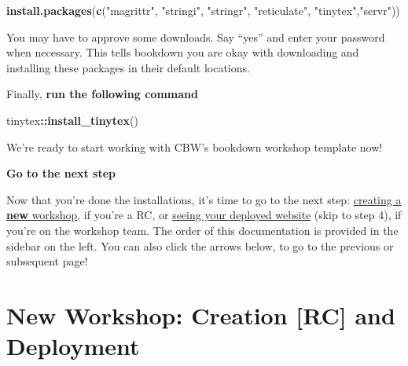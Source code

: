 \documentclass[
]{book}
\newenvironment{Shaded}{\begin{snugshade}}{\end{snugshade}}
\newcommand{\FunctionTok}[1]{\textcolor[rgb]{0.13,0.29,0.53}{\textbf{#1}}}
\newcommand{\NormalTok}[1]{#1}
\newcommand{\SpecialCharTok}[1]{\textcolor[rgb]{0.81,0.36,0.00}{\textbf{#1}}}
\newcommand{\StringTok}[1]{\textcolor[rgb]{0.31,0.60,0.02}{#1}}
\newenvironment{bluebox}{
  \definecolor{shadecolor}{RGB}{172, 210, 237}
  \color{white}
  \begin{shaded}}
 {\end{shaded}}
\theoremstyle{definition}
\theoremstyle{definition}
\theoremstyle{definition}
\theoremstyle{definition}
\theoremstyle{remark}
\begin{document}
\begin{enumerate}
\begin{itemize}
\begin{Shaded}
\begin{Highlighting}[]
\FunctionTok{install.packages}\NormalTok{(}\FunctionTok{c}\NormalTok{(}\StringTok{"magrittr"}\NormalTok{, }\StringTok{"stringi"}\NormalTok{, }\StringTok{"stringr"}\NormalTok{, }\StringTok{"reticulate"}\NormalTok{, }\StringTok{"tinytex"}\NormalTok{,}\StringTok{"servr"}\NormalTok{))}
\end{Highlighting}
\end{Shaded}

    You may have to approve some downloads. Say ``yes'' and enter your password when necessary. This tells bookdown you are okay with downloading and installing these packages in their default locations.

    Finally, \textbf{run the following command}

\begin{Shaded}
\begin{Highlighting}[]
\NormalTok{tinytex}\SpecialCharTok{::}\FunctionTok{install\_tinytex}\NormalTok{()}
\end{Highlighting}
\end{Shaded}
  \end{itemize}
\end{enumerate}

We're ready to start working with CBW's bookdown workshop template now!

\begin{bluebox}

\begin{center}
\textbf{Go to the next step}

\end{center}

Now that you're done the installations, it's time to go to the next step: \hyperref[rc-workshop-setup]{creating a \textbf{new} workshop}, if you're a RC, or \hyperref[check-deploy]{seeing your deployed website} (skip to step 4), if you're on the workshop team. The order of this documentation is provided in the sidebar on the left. You can also click the arrows below, to go to the previous or subsequent page!

\end{bluebox}

\chapter{\texorpdfstring{\textbf{New Workshop}: Creation {[}RC{]} and Deployment}{New Workshop: Creation {[}RC{]} and Deployment}}\label{new-workshop-create-deploy}
\end{document}
